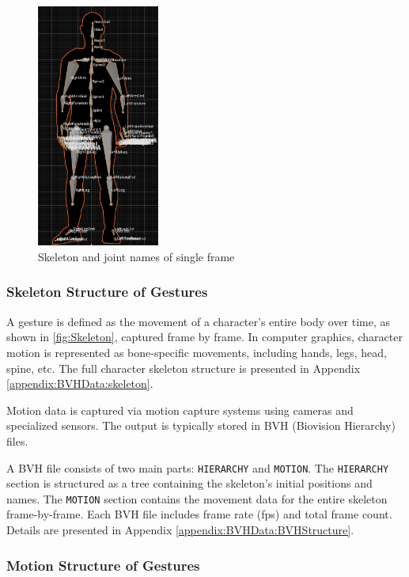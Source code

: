 \begin{figure}[h]
	\centering
	\centering
	\includegraphics[height=8cm]{images/Skeleton.png}
	\caption{\small Skeleton and joint names of single frame}
	\label{fig:Skeleton}
\end{figure}

\subsubsection{Skeleton Structure of Gestures}

A gesture is defined as the movement of a character's entire body over time, as shown in \autoref{fig:Skeleton}, captured frame by frame. In computer graphics, character motion is represented as bone-specific movements, including hands, legs, head, spine, etc. The full character skeleton structure is presented in Appendix \autoref{appendix:BVHData:skeleton}.

Motion data is captured via motion capture systems using cameras and specialized sensors. The output is typically stored in BVH (Biovision Hierarchy) files.

A BVH file consists of two main parts: \texttt{HIERARCHY} and \texttt{MOTION}. The \texttt{HIERARCHY} section is structured as a tree containing the skeleton’s initial positions and names. The \texttt{MOTION} section contains the movement data for the entire skeleton frame-by-frame. Each BVH file includes frame rate (fps) and total frame count. Details are presented in Appendix \ref{appendix:BVHData:BVHStructure}.

\subsubsection{Motion Structure of Gestures}

